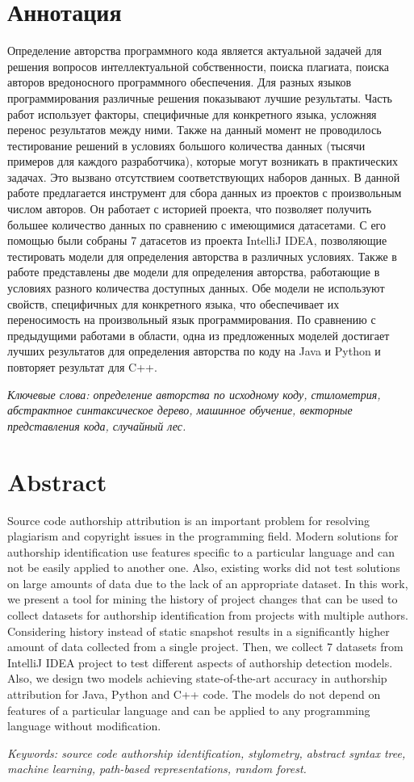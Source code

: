 \documentclass[hidelinks]{spbau-diploma}
\begin{document}
\section*{Аннотация}

Определение авторства программного кода является актуальной задачей для решения вопросов интеллектуальной собственности, поиска плагиата, поиска авторов вредоносного программного обеспечения. Для разных языков программирования различные решения показывают лучшие результаты. Часть работ использует факторы, специфичные для конкретного языка, усложняя перенос результатов между ними. Также на данный момент не проводилось тестирование решений в условиях большого количества данных (тысячи примеров для каждого разработчика), которые могут возникать в практических задачах. Это вызвано отсутствием соответствующих наборов данных. В данной работе предлагается инструмент для сбора данных из проектов с произвольным числом авторов. Он работает с историей проекта, что позволяет получить большее количество данных по сравнению с имеющимися датасетами. С его помощью были собраны 7 датасетов из проекта IntelliJ IDEA, позволяющие тестировать модели для определения авторства в различных условиях. Также в работе представлены две модели для определения авторства, работающие в условиях разного количества доступных данных. Обе модели не используют свойств, специфичных для конкретного языка, что обеспечивает их переносимость на произвольный язык программирования. По сравнению с предыдущими работами в области, одна из предложенных моделей достигает лучших результатов для определения авторства по коду на Java и Python и повторяет результат для C++.

\textit{Ключевые слова: определение авторства по исходному коду, стилометрия, абстрактное синтаксическое дерево, машинное обучение, векторные представления кода, случайный лес.}
\pagebreak


\section*{Abstract}
Source code authorship attribution is an important problem for resolving plagiarism and copyright issues in the programming field. Modern solutions for authorship identification use features specific to a particular language and can not be easily applied to another one. Also, existing works did not test solutions on large amounts of data due to the lack of an appropriate dataset. In this work, we present a tool for mining the history of project changes that can be used to collect datasets for authorship identification from projects with multiple authors. Considering history instead of static snapshot results in a significantly higher amount of data collected from a single project. Then, we collect 7 datasets from IntelliJ IDEA project to test different aspects of authorship detection models. Also, we design two models achieving state-of-the-art accuracy in authorship attribution for Java, Python and C++ code. The models do not depend on features of a particular language and can be applied to any programming language without modification.

\textit{Keywords: source code authorship identification, stylometry, abstract syntax tree, machine learning, path-based representations, random forest.}
\end{document}
